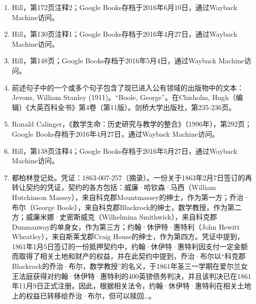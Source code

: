 \begin{enumerate}
\item Hill，第172页注释2；Google Books存档于2016年6月10日，通过Wayback Machine访问。  
\item Hill，第130页注释1；Google Books存档于2016年4月27日，通过Wayback Machine访问。  
\item Hill，第148页；Google Books存档于2016年5月4日，通过Wayback Machine访问。  
\item 前述句子中的一个或多个句子包含了现已进入公有领域的出版物中的文本：Jevons, William Stanley (1911)。“Boole, George”。在Chisholm, Hugh（编辑）《大英百科全书》第4卷（第11版）。剑桥大学出版社，第235-236页。
\item Ronald Calinger，《数学生命：历史研究与教学的整合》（1996年），第292页；Google Books存档于2016年4月27日，通过Wayback Machine访问。  
\item Hill，第138页注释4；Google Books存档于2016年5月27日，通过Wayback Machine访问。  
\item 都柏林登记处。凭证：1863-007-257（摘录）。一份关于1863年2月7日签订的再转让契约的凭证，契约的各方包括：威廉·哈钦森·马西（William Hutchinson Massey），来自科克郡Mountmassey的绅士，作为第一方；乔治·布尔（George Boole），来自科克郡Blackrock的绅士，数学教授，作为第二方；威廉米娜·史密斯威克（Wilhelmina Smithwick），来自科克郡Dunmanway的单身女，作为第三方；约翰·休伊特·惠特利（John Hewitt Wheatley），来自斯莱戈郡Craig House的绅士，作为第四方。凭证中提到，1861年1月5日签订的一份抵押契约中，约翰·休伊特·惠特利因支付一定金额而取得了相关土地和财产的权益，并在此契约中提到，乔治·布尔以“科克郡Blackrock的乔治·布尔，数学教授”的名义，于1861年圣三一学期在爱尔兰女王法庭获得对约翰·休伊特·惠特利的400英镑债务判决，并且该判决已在1861年11月9日正式注册。因此，根据相关法令，约翰·休伊特·惠特利在相关土地上的权益已转移给乔治·布尔，但可以赎回…。
\end{enumerate}